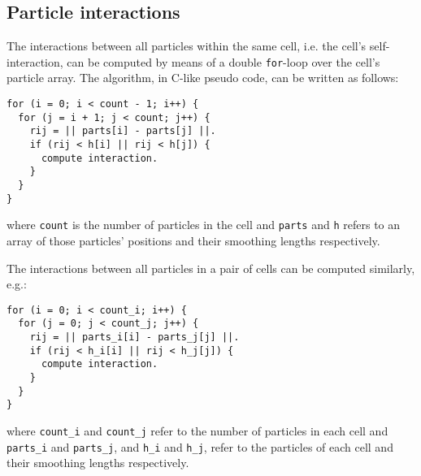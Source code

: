 \documentclass[final]{siamltex}
\begin{document}
\subsection{Particle interactions}

The interactions between all particles within the same cell,
i.e. the cell's self-interaction, can be computed by means of
a double {\tt for}-loop over the cell's particle array.
The algorithm, in C-like pseudo code, can be written as follows:

\begin{center}\begin{minipage}{0.8\textwidth}
    \begin{lstlisting}
for (i = 0; i < count - 1; i++) {
  for (j = i + 1; j < count; j++) {
    rij = || parts[i] - parts[j] ||.
    if (rij < h[i] || rij < h[j]) {
      compute interaction.
    }
  }
}
    \end{lstlisting}
\end{minipage}\end{center}

\noindent where {\tt count} is the number of particles in the
cell and {\tt parts} and {\tt h} refers to an array of those
particles' positions and their smoothing lengths respectively.

The interactions between all particles in a pair of cells
can be computed similarly, e.g.:
   
\begin{center}\begin{minipage}{0.8\textwidth}
    \begin{lstlisting}
for (i = 0; i < count_i; i++) {
  for (j = 0; j < count_j; j++) {
    rij = || parts_i[i] - parts_j[j] ||.
    if (rij < h_i[i] || rij < h_j[j]) {
      compute interaction.
    }
  }
}
    \end{lstlisting}
\end{minipage}\end{center}

\noindent where {\tt count\_i} and {\tt count\_j} refer to
the number of particles in each cell and {\tt parts\_i} and
{\tt parts\_j}, and {\tt h\_i} and {\tt h\_j}, refer to the
particles of each cell and their smoothing lengths respectively.
\end{document}
